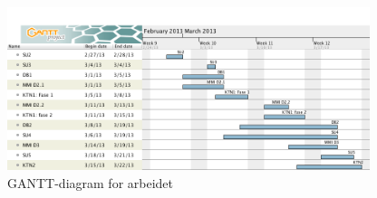 \begin{figure}[H]
\label{fig:gantt}
\includegraphics[width=400px]{Gantt-diagram.png}
\caption{GANTT-diagram for arbeidet}
\end{figure}